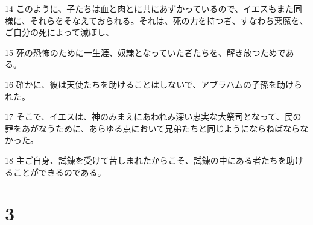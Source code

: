 \par 14 このように、子たちは血と肉とに共にあずかっているので、イエスもまた同様に、それらをそなえておられる。それは、死の力を持つ者、すなわち悪魔を、ご自分の死によって滅ぼし、
\par 15 死の恐怖のために一生涯、奴隷となっていた者たちを、解き放つためである。
\par 16 確かに、彼は天使たちを助けることはしないで、アブラハムの子孫を助けられた。
\par 17 そこで、イエスは、神のみまえにあわれみ深い忠実な大祭司となって、民の罪をあがなうために、あらゆる点において兄弟たちと同じようにならねばならなかった。
\par 18 主ご自身、試錬を受けて苦しまれたからこそ、試錬の中にある者たちを助けることができるのである。

\chapter{3}

